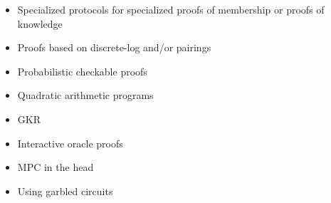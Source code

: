 \begin{itemize}

\item\label{paradigms:specialized} Specialized protocols for specialized proofs of membership or proofs of knowledge

\item\label{paradigms:DL+pairings} Proofs based on discrete-log and/or pairings

\item\label{paradigms:PCP} Probabilistic checkable proofs

\item\label{paradigms:QAP} Quadratic arithmetic programs

\item\label{paradigms:GKR} GKR

\item\label{paradigms:IOP} Interactive oracle proofs

\item\label{paradigms:mpc-in-the-head} MPC in the head

\item\label{paradigms:using-GCs} Using garbled circuits

\end{itemize}




